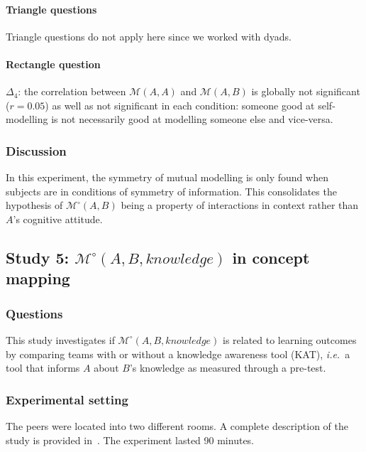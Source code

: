 \documentclass[twocolumn]{article}
\newcommand{\ie}{{\textit{i.e.\ }}}
\newcommand{\gmodel}[2]{{$\mathcal{M}(#1, #2)$}}
\newcommand{\Model}[3]{{$\mathcal{M}^{\circ}(#1, #2, #3)$}}
\newcommand{\gModel}[2]{{$\mathcal{M}^{\circ}(#1, #2)$}}
\begin{document}
\paragraph{Triangle questions} Triangle questions do not apply here since we
worked with dyads.

\paragraph{Rectangle question}$\Delta_4$: the correlation between \gmodel{A}{A}
and \gmodel{A}{B} is globally not significant ($r=0.05$) as well as not
significant in each condition: someone good at self-modelling is not necessarily
good at modelling someone else and vice-versa.

\subsubsection*{Discussion}

In this experiment, the symmetry of mutual modelling is only found when subjects
are in conditions of symmetry of information. This consolidates the hypothesis
of \gModel{A}{B} being a property of interactions in context rather than $A$'s
cognitive attitude.



\subsection{Study 5: \Model{A}{B}{knowledge} in concept mapping}

\subsubsection*{Questions}

This study investigates if \Model{A}{B}{knowledge} is related to learning
outcomes by comparing teams with or without a knowledge awareness tool (KAT),
\ie a tool that informs $A$ about $B$'s knowledge as measured through a pre-test.

\subsubsection*{Experimental setting}

The peers were located into two different rooms. A complete description of the
study is provided in~\citep{sangin2008learners}. The experiment lasted 90 minutes.
\end{document}
